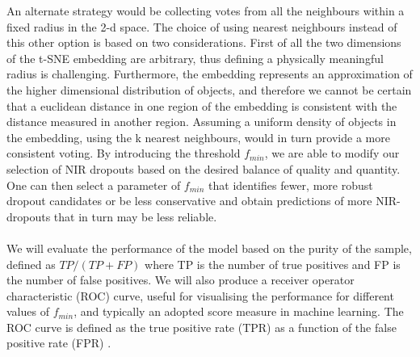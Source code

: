 An alternate strategy would be collecting votes from all the neighbours within a fixed radius in the 2-d space. The choice of using nearest neighbours instead of this other option is based on two considerations. First of all the two dimensions of the t-SNE embedding are arbitrary, thus defining a physically meaningful radius is challenging. Furthermore, the embedding represents an approximation of the higher dimensional distribution of objects, and therefore we cannot be certain that a euclidean distance in one region of the embedding is consistent with the distance measured in another region. Assuming a uniform density of objects in the embedding, using the k nearest neighbours, would in turn provide a more consistent voting. By introducing the threshold $f_{min}$, we are able to modify our selection of NIR dropouts based on the desired balance of quality and quantity. One can then select a parameter of $f_{min}$ that identifies fewer, more robust dropout candidates or be less conservative and obtain predictions of more NIR-dropouts that in turn may be less reliable. \\ \\
We will evaluate the performance of the model based on the purity of the sample, defined as $TP/(TP+FP)$ where TP is the number of true positives and FP is the number of false positives. We will also produce a receiver operator characteristic (ROC) curve, useful for visualising the performance for different values of $f_{min}$, and typically an adopted score measure in machine learning. The ROC curve is defined as the true positive rate (TPR) as a function of the false positive rate (FPR) \cite{FAWCETT2006861_ROC}.